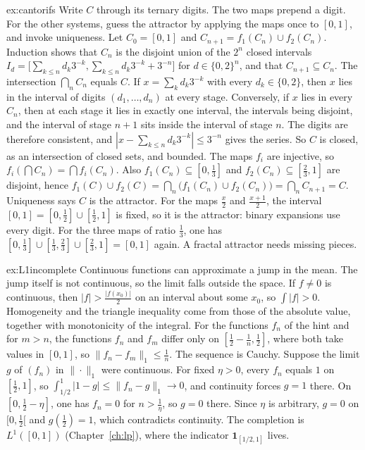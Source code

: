 \begin{solution}{ex:cantorifs}
\idea Write $C$ through its ternary digits. The two maps prepend a digit. For the other systems, guess the attractor by applying the maps once to $[0,1]$, and invoke uniqueness.
\writeup Let $C_0=[0,1]$ and $C_{n+1}=f_1(C_n)\cup f_2(C_n)$. Induction shows that $C_n$ is the disjoint union of the $2^n$ closed intervals $I_d=\bigl[\sum_{k\le n}d_k3^{-k},\sum_{k\le n}d_k3^{-k}+3^{-n}\bigr]$ for $d\in\{0,2\}^n$, and that $C_{n+1}\subseteq C_n$. The intersection $\bigcap_n C_n$ equals $C$. If $x=\sum_k d_k3^{-k}$ with every $d_k\in\{0,2\}$, then $x$ lies in the interval of digits $(d_1,\dots,d_n)$ at every stage. Conversely, if $x$ lies in every $C_n$, then at each stage it lies in exactly one interval, the intervals being disjoint, and the interval of stage $n+1$ sits inside the interval of stage $n$. The digits are therefore consistent, and $|x-\sum_{k\le n}d_k3^{-k}|\le3^{-n}$ gives the series. So $C$ is closed, as an intersection of closed sets, and bounded. The maps $f_i$ are injective, so $f_i(\bigcap C_n)=\bigcap f_i(C_n)$. Also $f_1(C_n)\subseteq[0,\frac13]$ and $f_2(C_n)\subseteq[\frac23,1]$ are disjoint, hence $f_1(C)\cup f_2(C)=\bigcap_n\bigl(f_1(C_n)\cup f_2(C_n)\bigr)=\bigcap_n C_{n+1}=C$. Uniqueness says $C$ is the attractor. For the maps $\frac x2$ and $\frac{x+1}2$, the interval $[0,1]=[0,\frac12]\cup[\frac12,1]$ is fixed, so it is the attractor: binary expansions use every digit. For the three maps of ratio $\frac13$, one has $[0,\frac13]\cup[\frac13,\frac23]\cup[\frac23,1]=[0,1]$ again. A fractal attractor needs missing pieces.
\end{solution}

\begin{solution}{ex:L1incomplete}
\idea Continuous functions can approximate a jump in the mean. The jump itself is not continuous, so the limit falls outside the space.
\writeup If $f\ne0$ is continuous, then $|f|>\frac{|f(x_0)|}2$ on an interval about some $x_0$, so $\int|f|>0$. Homogeneity and the triangle inequality come from those of the absolute value, together with monotonicity of the integral. For the functions $f_n$ of the hint and for $m>n$, the functions $f_n$ and $f_m$ differ only on $[\frac12-\frac1n,\frac12]$, where both take values in $[0,1]$, so $\|f_n-f_m\|_1\le\frac1n$. The sequence is Cauchy. Suppose the limit $g$ of $(f_n)$ in $\|\cdot\|_1$ were continuous. For fixed $\eta>0$, every $f_n$ equals $1$ on $[\frac12,1]$, so $\int_{1/2}^1|1-g|\le\|f_n-g\|_1\to0$, and continuity forces $g=1$ there. On $[0,\frac12-\eta]$, one has $f_n=0$ for $n>\frac1\eta$, so $g=0$ there. Since $\eta$ is arbitrary, $g=0$ on $[0,\frac12[$ and $g(\frac12)=1$, which contradicts continuity. The completion is $L^1([0,1])$ (Chapter~\ref{ch:lp}), where the indicator $\mathbf 1_{[1/2,1]}$ lives.
\end{solution}

